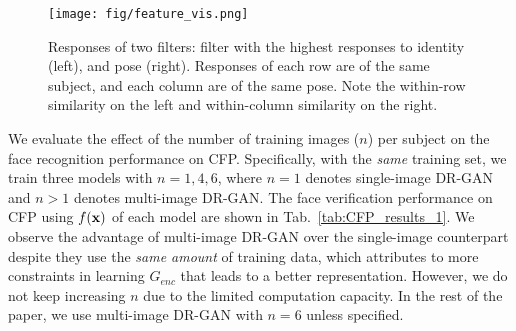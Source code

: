 \documentclass[10pt,journal,compsoc]{IEEEtran}
\begin{document}
\begin{figure}[t!]
  \begin{center}
  \small
   \texttt{[image: fig/feature\_vis.png]}
\vspace{-2mm}
\caption{\small Responses of two filters: filter with the highest responses to identity (left), and pose (right). Responses of each row are of the same subject, and each column are of the same pose. Note the within-row similarity on the left and within-column similarity on the right.}
\label{fig:feature_visual}\figvspace \vspace{-1mm}
\end{center}
\end{figure}\label{sec:single_vs_multiple_training}
We evaluate the effect of the number of training images ($n$) per subject on the face recognition performance on CFP. 
Specifically, with the {\it same} training set, we train three models with $n=1,4,6$, where $n=1$ denotes single-image DR-GAN and $n>1$ denotes multi-image DR-GAN.
The face verification performance on CFP using $f({\bf{x}})$ of each model are shown in Tab.~\ref{tab:CFP_results_1}.
We observe the advantage of multi-image DR-GAN over the single-image counterpart despite they use the {\it same amount} of training data, which attributes to more constraints in learning $G_{enc}$ that leads to a better representation. 
However, we do not keep increasing $n$ due to the limited computation capacity. 
In the rest of the paper, we use multi-image DR-GAN with $n=6$ unless specified. 
\end{document}
